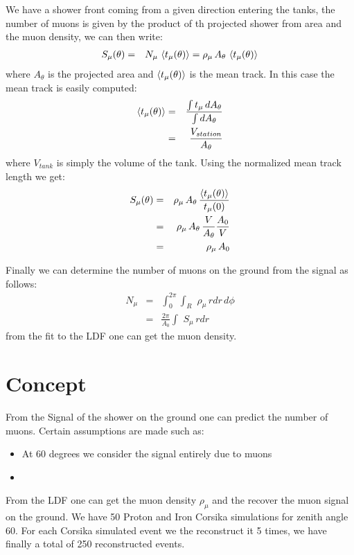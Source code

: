 \documentclass[12pt,a4paper,oneside]{book}
\begin{document}
We have a shower front coming from a given direction entering the tanks, the number of muons is given by the product of th projected shower from area and the muon density, we can then write:\begin{eqnarray}
S_{\mu}(\theta) &=& N_{\mu} \, \left < t_{\mu}(\theta) \right > = \rho_{\mu} \, A_{\theta} \, \left < t_{\mu}(\theta) \right >
\end{eqnarray}where $A_{\theta}$ is the projected area and $\left < t_{\mu}(\theta) \right >$ is the mean track. In this case the mean track is easily computed:\begin{eqnarray}
\left < t_{\mu}(\theta) \right > &=& \frac{\int t_{\mu} \, dA_{\theta}}{\int dA_{\theta}}\\
&=&\frac{V_{station}}{A_{\theta}}
\end{eqnarray}where $V_{tank}$ is simply the volume of the tank. Using the normalized mean track length we get:\begin{eqnarray}
S_{\mu}(\theta) &=&\rho_{\mu} \, A_{\theta} \, \frac{\left < t_{\mu}(\theta) \right >}{t_{\mu}(0)}\\
&=&\rho_{\mu} \, A_{\theta} \, \frac{V}{A_{\theta}} \frac{A_{0}}{V}\\
&=&\rho_{\mu} \, A_{0}
\end{eqnarray}

Finally we can determine the number of muons on the ground from the signal as follows:\begin{eqnarray}
N_{\mu}  &=& \int_0^{2\pi} \int_R\,\,\rho_{\mu} \,r dr\, d\phi\\
&=& \frac{2\pi}{A_{0}}\int \,\, S_{\mu} \, rdr
\end{eqnarray}from the fit to the LDF one can get the muon density.








\section{Concept}

From the Signal of the shower on the ground one can predict the number of muons. Certain assumptions are made such as:\begin{itemize}
\item At 60 degrees we consider the signal entirely due to muons
\item 
\end {itemize}
From the LDF one can get the muon density $\rho_{\mu}$ and the recover the muon signal on the ground. We have 50 Proton and Iron Corsika simulations for zenith angle 60. For each Corsika simulated event we the reconstruct it 5 times, we have finally a total of 250 reconstructed events.
\end{document}

